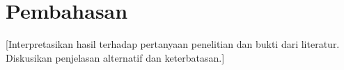 \chapter{Pembahasan}
[Interpretasikan hasil terhadap pertanyaan penelitian dan bukti dari literatur. Diskusikan penjelasan alternatif dan keterbatasan.]

